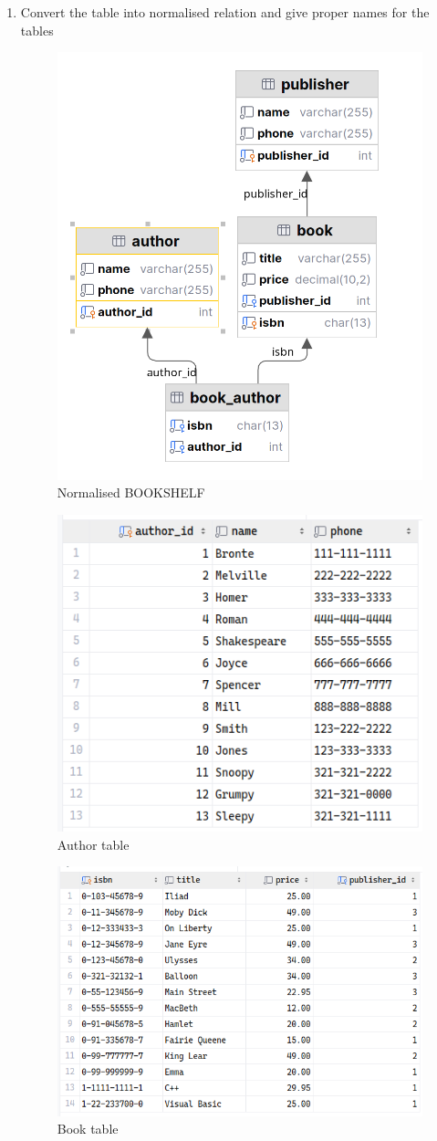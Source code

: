 \documentclass[12pt,titlepage]{article}
\begin{document}
\begin{enumerate}
    \item {
        Convert the table into normalised relation and give proper names for the tables

        \begin{figure}[h]
            \centering
            \includegraphics[width=.45\textwidth]{images/bookshelf-erd.png}
            \caption{Normalised BOOKSHELF}
        \end{figure}

        \begin{figure}[h]
            \centering
            \includegraphics[width=.45\textwidth]{images/author-table.png}
            \caption{Author table}
        \end{figure}

        \begin{figure}[h]
            \centering
            \includegraphics[width=.45\textwidth]{images/book-table.png}
            \caption{Book table}
        \end{figure}

}
\end{enumerate}
\end{document}

